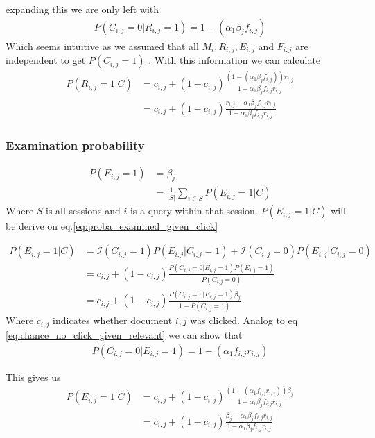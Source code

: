 expanding this we are only left with
\begin{align}
	P(C_{i,j}=0|R_{i,j}=1) = 1 - (\alpha_1 \beta_j f_{i,j})
	\label{eq:chance_no_click_given_relevant}
\end{align}
Which seems intuitive as we assumed that all $M_i, R_{i,j}, E_{i,j}$ and $F_{i,j}$ are independent to get $P(C_{i,j} = 1)$ . With this information we can calculate 
\begin{align}
	P(R_{i,j}=1 | C) &= c_{i,j} + (1-c_{i,j}) \frac { (1 - (\alpha_1 \beta_j f_{i,j}))  r_{i,j}} { 1 - \alpha_1 \beta_j f_{i,j} r_{i,j} } \\
	&= c_{i,j} + (1-c_{i,j}) \frac{r_{i,j} - \alpha_1 \beta_j f_{i,j} r_{i,j} }{ 1 - \alpha_1 \beta_j f_{i,j} r_{i,j}}
\end{align}

\subsubsection{Examination probability}
\begin{align}
	P(E_{i,j} = 1) 
	&= \beta_j \\
	&= \frac{1}{|S|} \sum_{i \in S} P(E_{i,j}=1 | C)
\end{align}
Where $S$ is all sessions and $i$ is a query within that session.
$P(E_{i,j}=1 | C)$ will be derive on eq.\ref{eq:proba_examined_given_click}

\begin{align}
	\label{eq:proba_examined_given_click}
	P(E_{i,j}=1 | C)
	&= \mathcal{I}(C_{i,j} = 1) P(E_{i,j}|C_{i,j}=1) + \mathcal{I}(C_{i,j} = 0) P(E_{i,j}|C_{i,j}=0) \\
	&= c_{i,j} + (1-c_{i,j}) \frac {P(C_{i,j}=0|E_{i,j}=1) P(E_{i,j} = 1)} {P(C_{i,j} = 0)} \\
	&= c_{i,j} + (1-c_{i,j}) \frac {P(C_{i,j}=0|E_{i,j}=1) \beta_j} { 1 - P(C_{i,j} = 1)}
\end{align}
Where $c_{i,j}$ indicates whether document $i,j$ was clicked.
Analog to eq \ref{eq:chance_no_click_given_relevant} we can show that
\begin{align}
	P(C_{i,j}=0|E_{i,j}=1) = 1 - (\alpha_1 f_{i,j} r_{i,j})
\end{align}

This gives us 
\begin{align}
	P(E_{i,j}=1 | C) 
	&= c_{i,j} + (1-c_{i,j}) \frac {( 1 - (\alpha_1 f_{i,j} r_{i,j}) )\beta_j} { 1 - \alpha_1 \beta_j f_{i,j} r_{i,j}} \\
	& = c_{i,j} + (1-c_{i,j}) \frac {\beta_j - \alpha_1 \beta_j f_{i,j} r_{i,j}} { 1 - \alpha_1 \beta_j f_{i,j} r_{i,j}}
\end{align}

